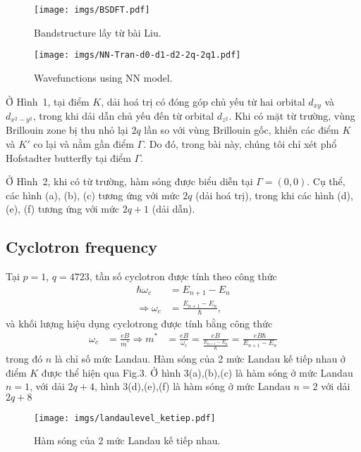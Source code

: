 \documentclass{article}
\begin{document}
\begin{figure*}[htb]
	\centering
	\texttt{[image: imgs/BSDFT.pdf]}
	\caption{Bandstructure lấy từ bài Liu.}
\end{figure*}
\begin{figure*}[htb]
	\centering
	\texttt{[image: imgs/NN-Tran-d0-d1-d2-2q-2q1.pdf]}
	\caption{Wavefunctions using NN model.}
\end{figure*}
Ở {Hình~1}, tại điểm $K$, dải hoá trị có đóng góp chủ yếu từ hai orbital $d_{xy}$ và $d_{x^{2} - y^{2}}$, trong khi dải dẫn chủ yếu đến từ orbital $d_{z^{2}}$. Khi có mặt từ trường, vùng Brillouin zone bị thu nhỏ lại $2q$ lần so với vùng Brillouin gốc, khiến các điểm $K$ và $K'$ co lại và nằm gần điểm $\Gamma$. Do đó, trong bài này, chúng tôi chỉ xét phổ Hofstadter butterfly tại điểm $\Gamma$.

Ở {Hình~2}, khi có từ trường, hàm sóng được biểu diễn tại $\Gamma = (0,0)$. Cụ thể, các hình {(a)}, {(b)}, {(c)} tương ứng với mức $2q$ (dải hoá trị), trong khi các hình {(d)}, {(e)}, {(f)} tương ứng với mức $2q+1$ (dải dẫn).

\subsection{Cyclotron frequency}
Tại $p = 1$, $q = 4723$, tần số cyclotron được tính theo công thức
\begin{equation}
	\begin{aligned}
		\hbar \omega_{c}       & = E_{n+1} - E_{n}                \\
		\Rightarrow \omega_{c} & = \frac{E_{n+1} - E_{n}}{\hbar},
	\end{aligned}
\end{equation}
và khối lượng hiệu dụng cyclotrong được tính bằng công thức
\begin{equation}
	\begin{aligned}
		\omega_{c}        & = \frac{eB}{m^{*}}
		\Rightarrow m^{*} & =  \frac{eB}{\omega_{c}} = \frac{eB}{\frac{E_{n+1} - E_{n}}{\hbar}} = \frac{eB \hbar}{E_{n+1} - E_{n}}
	\end{aligned}
\end{equation}
trong đó $n$ là chỉ số mức Landau. Hàm sóng của 2 mức Landau kế tiếp nhau ở điểm $K$ được thể hiện qua Fig.3. Ở hình 3(a),(b),(c) là hàm sóng ở mức Landau $n=1$, với dải $2q+4$, hình 3(d),(e),(f) là hàm sóng ở mức Landau $n=2$ với dải $2q+8$
\begin{figure*}[htb]
	\centering
	\texttt{[image: imgs/landaulevel\_ketiep.pdf]}
	\caption{Hàm sóng của 2 mức Landau kế tiếp nhau.}
\end{figure*}
\end{document}
